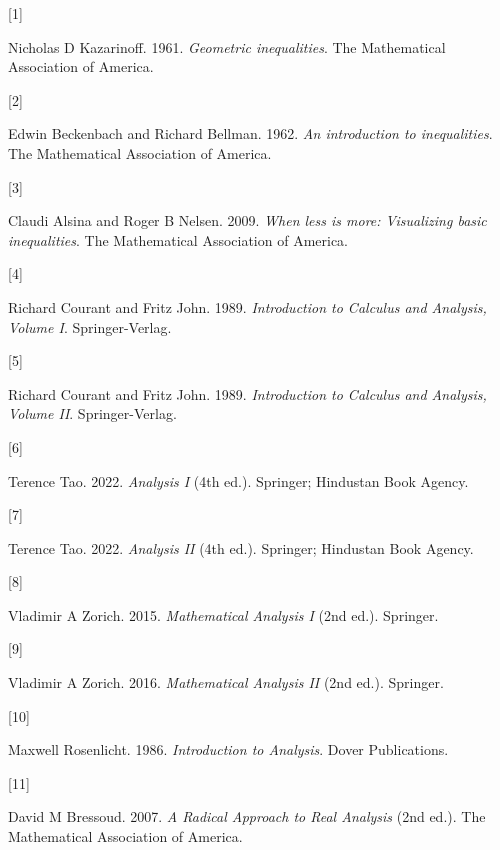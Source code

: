 \documentclass[
  a4paper,
]{article}
\newlength{\cslhangindent}
\newlength{\csllabelwidth}
\newenvironment{CSLReferences}[2] %
 {\begin{list}{}{%
  \setlength{\itemindent}{0pt}
  \setlength{\leftmargin}{0pt}
  \setlength{\parsep}{0pt}
  \ifodd #1
   \setlength{\leftmargin}{\cslhangindent}
   \setlength{\itemindent}{-1\cslhangindent}
  \fi
  \setlength{\itemsep}{#2\baselineskip}}}
 {\end{list}}
\newcommand{\CSLLeftMargin}[1]{\parbox[t]{\csllabelwidth}{\strut#1\strut}}
\newcommand{\CSLRightInline}[1]{\parbox[t]{\linewidth - \csllabelwidth}{\strut#1\strut}}
\begin{document}
\label{refs}
\begin{CSLReferences}{0}{0}
\CSLLeftMargin{{[}1{]} }%
\CSLRightInline{Nicholas D Kazarinoff. 1961. \emph{Geometric
inequalities}. The Mathematical Association of America.}

\CSLLeftMargin{{[}2{]} }%
\CSLRightInline{Edwin Beckenbach and Richard Bellman. 1962. \emph{An
introduction to inequalities}. The Mathematical Association of America.}

\CSLLeftMargin{{[}3{]} }%
\CSLRightInline{Claudi Alsina and Roger B Nelsen. 2009. \emph{When less
is more: Visualizing basic inequalities}. The Mathematical Association
of America.}

\CSLLeftMargin{{[}4{]} }%
\CSLRightInline{Richard Courant and Fritz John. 1989.
\emph{{Introduction to Calculus and Analysis, Volume I}}.
Springer-Verlag.}

\CSLLeftMargin{{[}5{]} }%
\CSLRightInline{Richard Courant and Fritz John. 1989.
\emph{{Introduction to Calculus and Analysis, Volume II}}.
Springer-Verlag.}

\CSLLeftMargin{{[}6{]} }%
\CSLRightInline{Terence Tao. 2022. \emph{{Analysis I}} (4th ed.).
Springer; Hindustan Book Agency.}

\CSLLeftMargin{{[}7{]} }%
\CSLRightInline{Terence Tao. 2022. \emph{{Analysis II}} (4th ed.).
Springer; Hindustan Book Agency.}

\CSLLeftMargin{{[}8{]} }%
\CSLRightInline{Vladimir A Zorich. 2015. \emph{{Mathematical Analysis
I}} (2nd ed.). Springer.}

\CSLLeftMargin{{[}9{]} }%
\CSLRightInline{Vladimir A Zorich. 2016. \emph{{Mathematical Analysis
II}} (2nd ed.). Springer.}

\CSLLeftMargin{{[}10{]} }%
\CSLRightInline{Maxwell Rosenlicht. 1986. \emph{{Introduction to
Analysis}}. Dover Publications.}

\CSLLeftMargin{{[}11{]} }%
\CSLRightInline{David M Bressoud. 2007. \emph{{A Radical Approach to
Real Analysis}} (2nd ed.). The Mathematical Association of America.}


\end{CSLReferences}
\end{document}
